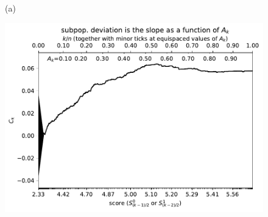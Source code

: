 \documentclass{article}
\newlength{\vertsep}
\newlength{\imsize}
\begin{document}
\begin{figure}
\begin{centering}

(a)
\parbox{\imsize}{\includegraphics[width=\imsize]
{../codes/weighted/County_of_San_Francisco_vs_Contra_Costa-LNGI/cumulative.pdf}}

\vspace{\vertsep}


\end{centering}
\end{figure}
\end{document}
